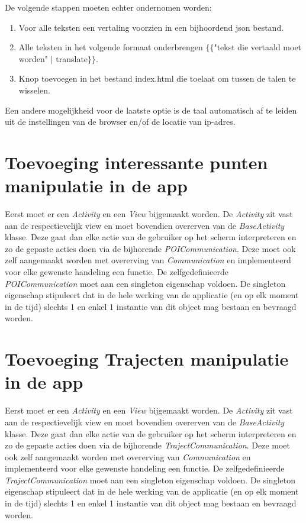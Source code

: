 \documentclass{article}
\newcommand*{\javaclass}[1]{\emph{#1}}
\begin{document}
De volgende stappen moeten echter ondernomen worden:
\begin{enumerate}
\item Voor alle teksten een vertaling voorzien in een bijhoordend json bestand.
\item Alle teksten in het volgende formaat onderbrengen $\{\{$"tekst die vertaald moet worden" $|$ translate$\}\}$.
\item Knop toevoegen in het bestand index.html die toelaat om tussen de talen te wisselen.
\end{enumerate}

Een andere mogelijkheid voor de laatste optie is de taal automatisch af te leiden uit de instellingen van de browser en/of de locatie van ip-adres.

\section{Toevoeging interessante punten manipulatie in de app}
Eerst moet er een \javaclass{Activity} en een \javaclass{View} bijgemaakt worden. De \javaclass{Activity} zit vast aan de respectievelijk view en moet bovendien overerven van de \javaclass{BaseActivity} klasse. Deze gaat dan elke actie van de gebruiker op het scherm interpreteren en zo de gepaste acties doen via de bijhorende \javaclass{POICommunication}. Deze moet ook zelf aangemaakt worden met overerving van \javaclass{Communication} en implementeerd voor elke gewenste handeling een functie. De zelfgedefinieerde \javaclass{POICommunication} moet aan een singleton eigenschap voldoen. De singleton eigenschap stipuleert dat in de hele werking van de applicatie (en op elk moment in de tijd) slechts 1 en enkel 1 instantie van dit object mag bestaan en bevraagd worden.

\section{Toevoeging Trajecten manipulatie in de app}
Eerst moet er een \javaclass{Activity} en een \javaclass{View} bijgemaakt worden. De \javaclass{Activity} zit vast aan de respectievelijk view en moet bovendien overerven van de \javaclass{BaseActivity} klasse. Deze gaat dan elke actie van de gebruiker op het scherm interpreteren en zo de gepaste acties doen via de bijhorende \javaclass{TrajectCommunication}. Deze moet ook zelf aangemaakt worden met overerving van \javaclass{Communication} en implementeerd voor elke gewenste handeling een functie. De zelfgedefinieerde \javaclass{TrajectCommunication} moet aan een singleton eigenschap voldoen. De singleton eigenschap stipuleert dat in de hele werking van de applicatie (en op elk moment in de tijd) slechts 1 en enkel 1 instantie van dit object mag bestaan en bevraagd worden.
\end{document}
